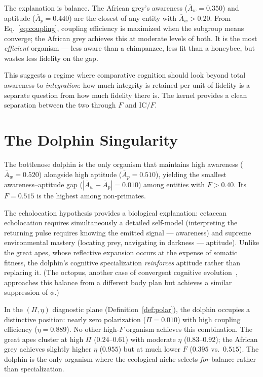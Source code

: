 \documentclass[
  aps,
  prd,
  twocolumn,
  superscriptaddress,
  nofootinbib,
  floatfix
]{revtex4-2}
\newcommand{\IC}{\mathrm{IC}}
\newcommand{\Aw}{\overline{A}_{\!w}}
\newcommand{\Ap}{\overline{A}_{\!p}}
\begin{document}
The explanation is balance.  The African grey's awareness
($\Aw = 0.350$) and aptitude ($\Ap = 0.440$) are the
closest of any entity with $\Aw > 0.20$.  From
Eq.~\ref{eq:coupling}, coupling efficiency is maximized when
the subgroup means converge; the African grey achieves this
at moderate levels of both.  It is the most \emph{efficient}
organism --- less aware than a chimpanzee, less fit than a
honeybee, but wastes less fidelity on the gap.

This suggests a regime where comparative cognition should look
beyond total awareness to \emph{integration}: how much
integrity is retained per unit of fidelity is a separate
question from how much fidelity there is.  The kernel provides
a clean separation between the two through $F$ and $\IC/F$.

\section{The Dolphin Singularity}\label{sec:dolphin}

The bottlenose dolphin is the only organism that maintains
high awareness ($\Aw = 0.520$) alongside high aptitude
($\Ap = 0.510$), yielding the smallest awareness--aptitude
gap ($|\Aw - \Ap| = 0.010$) among entities with $F > 0.40$.
Its $F = 0.515$ is the highest among non-primates.

The echolocation hypothesis provides a biological explanation:
cetacean echolocation requires simultaneously a detailed
self-model (interpreting the returning pulse requires knowing
the emitted signal --- awareness) and supreme environmental
mastery (locating prey, navigating in darkness --- aptitude).
Unlike the great apes, whose reflective expansion occurs at
the expense of somatic fitness, the dolphin's cognitive
specialization \emph{reinforces} aptitude rather than
replacing it.  (The octopus, another case of convergent
cognitive evolution~\cite{godfrey2016evolution}, approaches
this balance from a different body plan but achieves a
similar suppression of $\phi$.)

In the $(\Pi, \eta)$ diagnostic plane
(Definition~\ref{def:polar}), the dolphin occupies
a distinctive position: nearly zero polarization
($\Pi = 0.010$) with high coupling efficiency
($\eta = 0.889$).  No other high-$F$ organism achieves
this combination.  The great apes cluster at high
$\Pi$ ($0.24$--$0.61$) with moderate $\eta$ ($0.83$--$0.92$);
the African grey achieves slightly higher $\eta$ ($0.955$)
but at much lower $F$ ($0.395$ vs.~$0.515$).  The dolphin
is the only organism where the ecological niche selects
\emph{for} balance rather than specialization.
\end{document}
